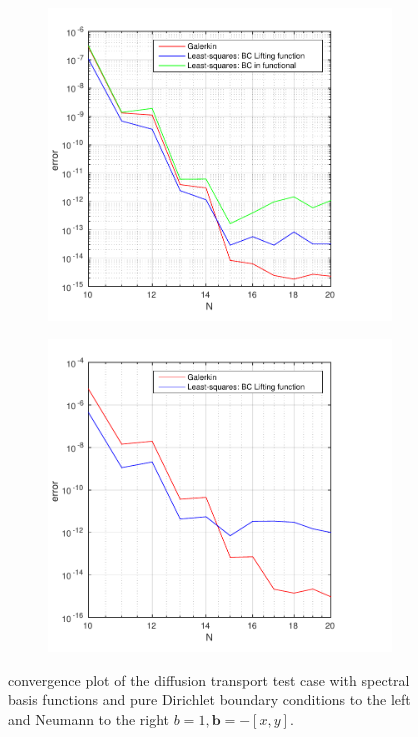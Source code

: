 %
\begin{figure}[h!]
  \centering
  \begin{subfigure}[b]{0.48\textwidth}
		\includegraphics[width=\textwidth]{Figures/Spec_difftrans_Convergence.pdf}
  \end{subfigure}%
  \quad
  \begin{subfigure}[b]{0.48\textwidth}
		\includegraphics[width=\textwidth]{Figures/Spec_difftrans_Convergence_Neu.pdf}
  \end{subfigure}
  \vspace{-0.1\baselineskip}
	\caption{convergence plot of the diffusion transport test case with spectral basis functions and pure Dirichlet boundary conditions to the left and Neumann to the right  $b = 1,\mathbf{b} = -[x,y]$.}
  \label{fig:ConvergenceDifftransSpec}
\end{figure}
%

